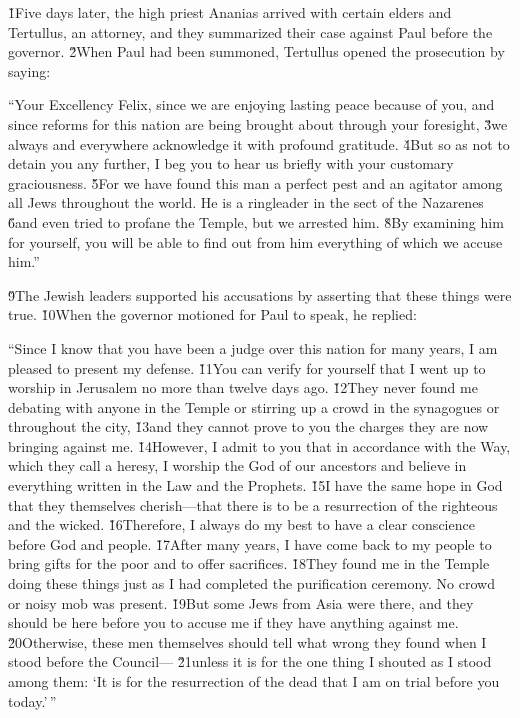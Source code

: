 \v{1}Five days later, the high priest Ananias arrived with certain elders and Tertullus, an attorney, and they summarized their case against Paul before the governor. \v{2}When Paul had been summoned, Tertullus opened the prosecution by saying:

``Your Excellency Felix, since we are enjoying lasting peace because of you, and since reforms for this nation are being brought about through your foresight, \v{3}we always and everywhere acknowledge it with profound gratitude. \v{4}But so as not to detain you any further, I beg you to hear us briefly with your customary graciousness. \v{5}For we have found this man a perfect pest and an agitator among all Jews throughout the world. He is a ringleader in the sect of the Nazarenes \v{6}and even tried to profane the Temple, but we arrested him. \v{8}By examining him for yourself, you will be able to find out from him everything of which we accuse him.''

\v{9}The Jewish leaders supported his accusations by asserting that these things were true. \v{10}When the governor motioned for Paul to speak, he replied:

``Since I know that you have been a judge over this nation for many years, I am pleased to present my defense. \v{11}You can verify for yourself that I went up to worship in Jerusalem no more than twelve days ago. \v{12}They never found me debating with anyone in the Temple or stirring up a crowd in the synagogues or throughout the city, \v{13}and they cannot prove to you the charges they are now bringing against me. \v{14}However, I admit to you that in accordance with the Way, which they call a heresy, I worship the God of our ancestors and believe in everything written in the Law and the Prophets. \v{15}I have the same hope in God that they themselves cherish---that there is to be a resurrection of the righteous and the wicked. \v{16}Therefore, I always do my best to have a clear conscience before God and people. \v{17}After many years, I have come back to my people to bring gifts for the poor and to offer sacrifices. \v{18}They found me in the Temple doing these things just as I had completed the purification ceremony. No crowd or noisy mob was present. \v{19}But some Jews from Asia were there, and they should be here before you to accuse me if they have anything against me. \v{20}Otherwise, these men themselves should tell what wrong they found when I stood before the Council--- \v{21}unless it is for the one thing I shouted as I stood among them: `It is for the resurrection of the dead that I am on trial before you today.'\,''

